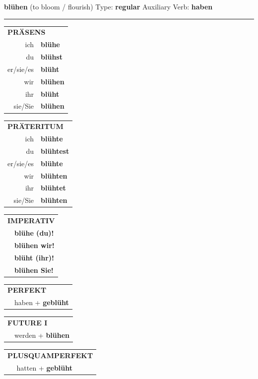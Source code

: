 \documentclass[10pt,a4paper]{revtex4-2}
\begin{document}
\begin{verbbox}
{\Large \bf blühen} (to bloom / flourish) \hfill Type: \textbf{regular} \hfill Auxiliary Verb: \textbf{haben}

\vspace{5pt}
\hrule
\vspace{5pt}

\begin{tabular}{rl}
\multicolumn{2}{l}{\textbf{PRÄSENS}}\\
ich & \textbf{blühe}\\
du & \textbf{blühst}\\
er/sie/es & \textbf{blüht}\\
wir & \textbf{blühen}\\
ihr & \textbf{blüht}\\
sie/Sie & \textbf{blühen}\\
\end{tabular}
\hfill
\begin{tabular}{rl}
\multicolumn{2}{l}{\textbf{PRÄTERITUM}}\\
ich & \textbf{blühte}\\
du & \textbf{blühtest}\\
er/sie/es & \textbf{blühte}\\
wir & \textbf{blühten}\\
ihr & \textbf{blühtet}\\
sie/Sie & \textbf{blühten}\\
\end{tabular}
\hfill
\begin{tabular}{rl}
\multicolumn{2}{l}{\textbf{IMPERATIV}}\\
& \textbf{blühe (du)!}\\
& \textbf{blühen wir!}\\
& \textbf{blüht (ihr)!}\\
& \textbf{blühen Sie!}\\
\end{tabular}

\vspace{10pt}

\begin{tabular}{rl}
\multicolumn{2}{l}{\textbf{PERFEKT}}\\
& haben + \textbf{geblüht}\\
\end{tabular}
\hfill
\begin{tabular}{rl}
\multicolumn{2}{l}{\textbf{FUTURE I}}\\
& werden + \textbf{blühen}\\
\end{tabular}
\hfill
\begin{tabular}{rl}
\multicolumn{2}{l}{\textbf{PLUSQUAMPERFEKT}}\\
& hatten + \textbf{geblüht}\\
\end{tabular}


\end{verbbox}
\end{document}
